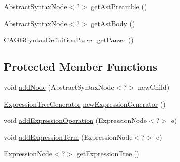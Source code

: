 \begin{DoxyCompactItemize}
Abstract\-Syntax\-Node$<$?$>$ \hyperlink{classit_1_1emarolab_1_1cagg_1_1core_1_1language_1_1parser_1_1ANTLRInterface_1_1TreeParserListener_ac0ea0fcdfb6a42c450dbbfdb49f6acfb}{get\-Ast\-Preamble} ()
\item 
Abstract\-Syntax\-Node$<$?$>$ \hyperlink{classit_1_1emarolab_1_1cagg_1_1core_1_1language_1_1parser_1_1ANTLRInterface_1_1TreeParserListener_aaa9fecbf4191a4ff7eb021a27397ee70}{get\-Ast\-Body} ()
\item 
\hyperlink{classit_1_1emarolab_1_1cagg_1_1core_1_1language_1_1parser_1_1ANTLRInterface_1_1ANTLRGenerated_1_1CAGGSyntaxDefinitionParser}{C\-A\-G\-G\-Syntax\-Definition\-Parser} \hyperlink{classit_1_1emarolab_1_1cagg_1_1core_1_1language_1_1parser_1_1ANTLRInterface_1_1TreeParserListener_af99571b92cc4f02b01194170fc91968d}{get\-Parser} ()
\end{DoxyCompactItemize}
\subsection*{Protected Member Functions}
\begin{DoxyCompactItemize}
\item 
void \hyperlink{classit_1_1emarolab_1_1cagg_1_1core_1_1language_1_1parser_1_1ANTLRInterface_1_1TreeParserListener_ad3a5f8269e83644eaeeb28256a8930b7}{add\-Node} (Abstract\-Syntax\-Node$<$?$>$ new\-Child)
\item 
\hyperlink{classit_1_1emarolab_1_1cagg_1_1core_1_1language_1_1syntax_1_1expressionTree_1_1ExpressionTreeGenerator}{Expression\-Tree\-Generator} \hyperlink{classit_1_1emarolab_1_1cagg_1_1core_1_1language_1_1parser_1_1ANTLRInterface_1_1TreeParserListener_adc4d433740aee2e537ee65c3dd7a1748}{new\-Expression\-Generator} ()
\item 
void \hyperlink{classit_1_1emarolab_1_1cagg_1_1core_1_1language_1_1parser_1_1ANTLRInterface_1_1TreeParserListener_a3ec7201bc82a1d120a7a6ede80ca870d}{add\-Expression\-Operation} (Expression\-Node$<$?$>$ e)
\item 
void \hyperlink{classit_1_1emarolab_1_1cagg_1_1core_1_1language_1_1parser_1_1ANTLRInterface_1_1TreeParserListener_a58c652345cc6669d13ba43059382f04b}{add\-Expression\-Term} (Expression\-Node$<$?$>$ e)
\item 
Expression\-Node$<$?$>$ \hyperlink{classit_1_1emarolab_1_1cagg_1_1core_1_1language_1_1parser_1_1ANTLRInterface_1_1TreeParserListener_a0606f9a99fdfe3c9f329f3ba1e012001}{get\-Expression\-Tree} ()
\end{DoxyCompactItemize}
